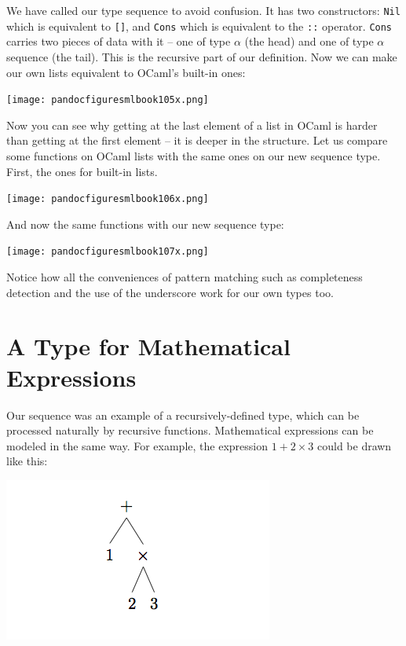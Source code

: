 \documentclass[]{book}
\newcommand{\smspace}{\vspace{4mm}}
\begin{document}
\noindent We have called our type \textsf{sequence} to avoid confusion. It has two constructors: \texttt{Nil} which is equivalent to \texttt{[]}, and \texttt{Cons} which is equivalent to the \texttt{::} operator. \texttt{Cons} carries two pieces of data with it -- one of type $\alpha$ (the head) and one of type \textsf{$\alpha$ sequence} (the tail). This is the recursive part of our definition. Now we can make our own lists equivalent to OCaml's built-in ones:

\medskip
\begin{center}
\noindent\texttt{[image: pandocfiguresmlbook105x.png]}
\end{center}
\medskip

\noindent Now you can see why getting at the last element of a list in OCaml is harder than getting at the first element -- it is deeper in the structure. Let us compare some functions on OCaml lists with the same ones on our new \textsf{sequence} type. First, the ones for built-in lists.

\medskip
\begin{center}
\noindent\texttt{[image: pandocfiguresmlbook106x.png]}
\end{center}
\medskip

\noindent And now the same functions with our new \textsf{sequence} type:

\medskip
\begin{center}
\noindent\texttt{[image: pandocfiguresmlbook107x.png]}
\end{center}
\medskip

\noindent Notice how all the conveniences of pattern matching such as completeness detection and the use of the underscore work for our own types too.

\section*{A Type for Mathematical Expressions}

Our \textsf{sequence} was an example of a recursively-defined type, which can be processed naturally by recursive functions. Mathematical expressions can be modeled in the same way. For example, the expression $1 + 2 \times 3$ could be drawn like this:

\smspace
\includegraphics{kindlefig1.png}
\smspace
\end{document}
